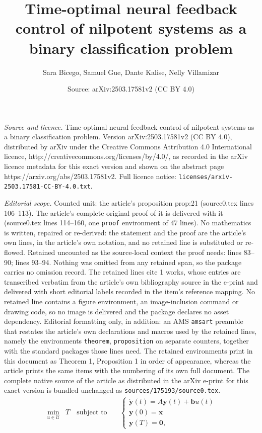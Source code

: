 \documentclass[10pt,a4paper]{amsart}
\title{Time-optimal neural feedback control of nilpotent systems as a binary classification problem}
\author{Sara Bicego, Samuel Gue, Dante Kalise, Nelly Villamizar}
\date{Source: arXiv:2503.17581v2 (CC BY 4.0)}
\begin{document}
\maketitle

\noindent\emph{Source and licence.} Time-optimal neural feedback control of nilpotent systems as a binary classification problem. Version arXiv:2503.17581v2 (CC BY 4.0), distributed by arXiv under the Creative Commons Attribution 4.0 International licence, http://creativecommons.org/licenses/by/4.0/, as recorded in the arXiv licence metadata for this exact version and shown on the abstract page https://arxiv.org/abs/2503.17581v2. Full licence notice: \texttt{licenses/arxiv-2503.17581-CC-BY-4.0.txt}.\par\smallskip

\noindent\textit{Editorial scope.} Counted unit: the article's proposition prop:21 (source0.tex lines 106--113). The article's complete original proof of it is delivered with it (source0.tex lines 114--160, one \texttt{proof} environment of 47 lines). No mathematics is written, repaired or re-derived: the statement and the proof are the article's own lines, in the article's own notation, and no retained line is substituted or re-flowed.  Retained uncounted as the source-local context the proof needs: lines 83--90; lines 93--94.  Nothing was omitted from any retained span, so the package carries no omission record.  The retained lines cite 1 works, whose entries are transcribed verbatim from the article's own bibliography source in the e-print and delivered with short editorial labels recorded in the item's reference mapping.  No retained line contains a figure environment, an image-inclusion command or drawing code, so no image is delivered and the package declares no asset dependency.  Editorial formatting only, in addition: an AMS \texttt{amsart} preamble that restates the article's own declarations and macros used by the retained lines, namely the environments \texttt{theorem}, \texttt{proposition} on separate counters, together with the standard packages those lines need.  The retained environments print in this document as Theorem 1, Proposition 1 in order of appearance, whereas the article prints the same items with the numbering of its own full document.  The complete native source of the article as distributed in the arXiv e-print for this exact version is bundled unchanged as \texttt{sources/175193/source0.tex}.
\begin{align}\label{eq:linearSystem}
 \underset{u\in\mathcal{U}}{\min} \;\;T\quad 
 \text{subject to} \quad
 &\begin{cases}\dot{\bm{y}}(t)=A\bm{y}(t)+\bm{b}u(t)\\
 \bm{y}(0)=\bm{x}\\
 \bm{y}(T)=\bm{0},
 \end{cases}
\end{align}
\end{document}
